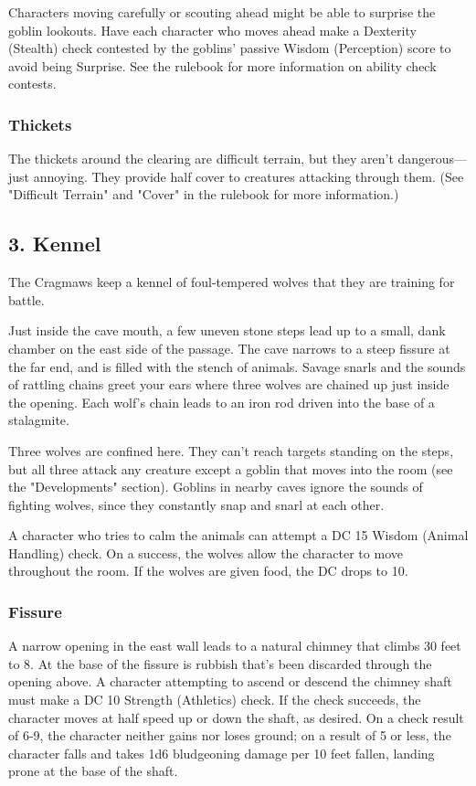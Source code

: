 \documentclass[10pt,a4paper,twoside,bg=print,twocolumn,openany,nodeprecatedcode]{dndbook}
\begin{document}
Characters moving carefully or scouting ahead might be able to surprise the goblin lookouts. Have each character who moves ahead make a Dexterity (Stealth) check contested by the goblins' passive Wisdom (Perception) score to avoid being Surprise. See the rulebook for more information on ability check contests.

\subsubsection{Thickets}
The thickets around the clearing are difficult terrain, but they aren't dangerous—just annoying. They provide half cover to creatures attacking through them. (See "Difficult Terrain" and "Cover" in the rulebook for more information.)

\subsection{3. Kennel}
The Cragmaws keep a kennel of foul-tempered wolves that they are training for battle.

\begin{DndReadAloud}{}
Just inside the cave mouth, a few uneven stone steps lead up to a small, dank chamber on the east side of the passage. The cave narrows to a steep fissure at the far end, and is filled with the stench of animals. Savage snarls and the sounds of rattling chains greet your ears where three wolves are chained up just inside the opening. Each wolf's chain leads to an iron rod driven into the base of a stalagmite.

\end{DndReadAloud}

Three wolves are confined here. They can't reach targets standing on the steps, but all three attack any creature except a goblin that moves into the room (see the "Developments" section). Goblins in nearby caves ignore the sounds of fighting wolves, since they constantly snap and snarl at each other.

A character who tries to calm the animals can attempt a DC 15 Wisdom (Animal Handling) check. On a success, the wolves allow the character to move throughout the room. If the wolves are given food, the DC drops to 10.

\subsubsection{Fissure}
A narrow opening in the east wall leads to a natural chimney that climbs 30 feet to 8. At the base of the fissure is rubbish that's been discarded through the opening above. A character attempting to ascend or descend the chimney shaft must make a DC 10 Strength (Athletics) check. If the check succeeds, the character moves at half speed up or down the shaft, as desired. On a check result of 6-9, the character neither gains nor loses ground; on a result of 5 or less, the character falls and takes 1d6 bludgeoning damage per 10 feet fallen, landing prone at the base of the shaft.
\end{document}

